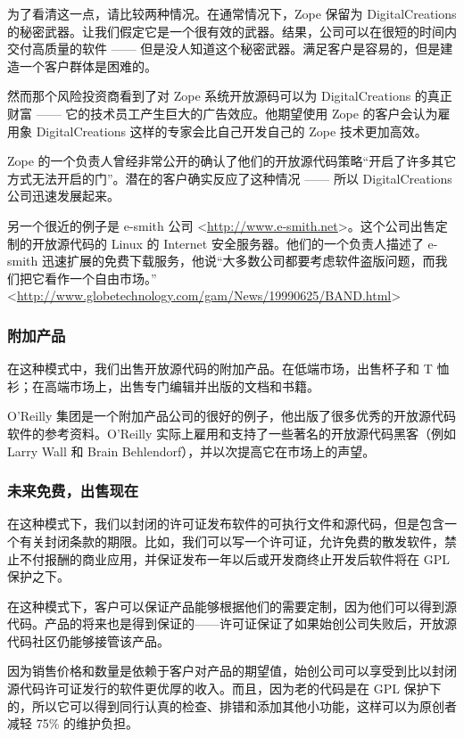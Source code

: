 为了看清这一点，请比较两种情况。在通常情况下，Zope 保留为 DigitalCreations 的秘密武器。让我们假定它是一个很有效的武器。结果，公司可以在很短的时间内交付高质量的软件 —— 但是没人知道这个秘密武器。满足客户是容易的，但是建造一个客户群体是困难的。


然而那个风险投资商看到了对 Zope 系统开放源码可以为 DigitalCreations 的真正财富 —— 它的技术员工产生巨大的广告效应。他期望使用 Zope 的客户会认为雇用象 DigitalCreations 这样的专家会比自己开发自己的 Zope 技术更加高效。


Zope 的一个负责人曾经非常公开的确认了他们的开放源代码策略“开启了许多其它方式无法开启的门”。潜在的客户确实反应了这种情况 —— 所以 DigitalCreations 公司迅速发展起来。


另一个很近的例子是 e-smith 公司 <\url{http://www.e-smith.net}>。这个公司出售定制的开放源代码的 Linux 的 Internet 安全服务器。他们的一个负责人描述了 e-smith 迅速扩展的免费下载服务，他说“大多数公司都要考虑软件盗版问题，而我们把它看作一个自由市场。” <\url{http://www.globetechnology.com/gam/News/19990625/BAND.html}>

\subsubsection{附加产品}
在这种模式中，我们出售开放源代码的附加产品。在低端市场，出售杯子和 T 恤衫；在高端市场上，出售专门编辑并出版的文档和书籍。


O'Reilly 集团是一个附加产品公司的很好的例子，他出版了很多优秀的开放源代码软件的参考资料。O'Reilly 实际上雇用和支持了一些著名的开放源代码黑客（例如 Larry Wall 和 Brain Behlendorf），并以次提高它在市场上的声望。

\subsubsection{未来免费，出售现在}
在这种模式下，我们以封闭的许可证发布软件的可执行文件和源代码，但是包含一个有关封闭条款的期限。比如，我们可以写一个许可证，允许免费的散发软件，禁止不付报酬的商业应用，并保证发布一年以后或开发商终止开发后软件将在 GPL 保护之下。


在这种模式下，客户可以保证产品能够根据他们的需要定制，因为他们可以得到源代码。产品的将来也是得到保证的——许可证保证了如果始创公司失败后，开放源代码社区仍能够接管该产品。


因为销售价格和数量是依赖于客户对产品的期望值，始创公司可以享受到比以封闭源代码许可证发行的软件更优厚的收入。而且，因为老的代码是在 GPL 保护下的，所以它可以得到同行认真的检查、排错和添加其他小功能，这样可以为原创者减轻 75\% 的维护负担。


